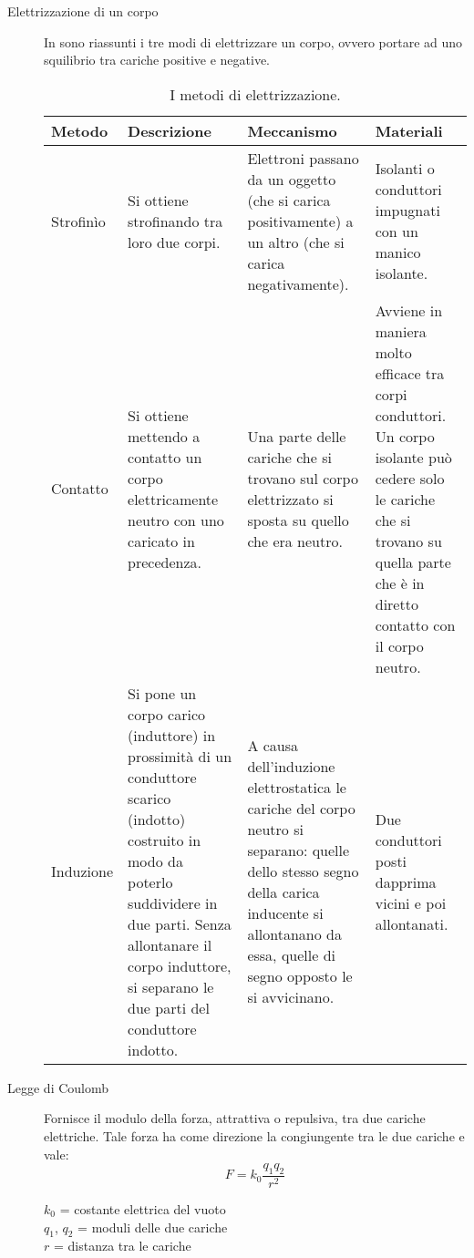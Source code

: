 \documentclass[a4paper,11pt,italian]{article}
\begin{document}
\begin{description}
  \item[Elettrizzazione di un corpo] 
  In  sono riassunti i tre modi di elettrizzare un corpo, ovvero portare ad uno squilibrio tra cariche positive e negative.

\begin{table}[htb]\centering\footnotesize
\begin{tabular}{p{} p{} p{} p{}}\toprule
\textbf{Metodo} & \textbf{Descrizione} & \textbf{Meccanismo} & \textbf{Materiali} \\\midrule
Strofinìo & Si ottiene strofinando tra loro due corpi. & Elettroni passano da un oggetto (che si carica positivamente) a un altro (che si carica negativamente). & Isolanti o conduttori impugnati con un manico isolante.\\\addlinespace[1em]
Contatto & Si ottiene mettendo a contatto un corpo elettricamente neutro con uno caricato in precedenza. & Una parte delle cariche che si trovano sul corpo elettrizzato si sposta su quello che era neutro. & Avviene in maniera molto efficace tra corpi conduttori. Un corpo isolante può cedere solo le cariche che si trovano su quella parte che è in diretto contatto con il corpo neutro.\\\addlinespace[1em]
Induzione & Si pone un corpo carico (induttore) in prossimità di un conduttore scarico (indotto) costruito in modo da poterlo suddividere in due parti. Senza allontanare il corpo induttore, si separano le due parti del conduttore indotto. & A causa dell’induzione elettrostatica le cariche del corpo neutro si separano: quelle dello stesso segno della carica inducente si allontanano da essa, quelle di segno opposto le si avvicinano. & Due conduttori posti dapprima vicini e poi allontanati.\\\bottomrule
\end{tabular}
\caption{I metodi di elettrizzazione.}
\label{tab:elettrizzazione}
\end{table}
  
  \item[Legge di Coulomb] 
  Fornisce il modulo della forza, attrattiva o repulsiva, tra due cariche elettriche. Tale forza ha come direzione la congiungente tra le due cariche e vale:
  \[ F = k_0 \frac{q_1q_2}{r^2} \]
  \begin{multicols}{2}
  $ k_0 $ = costante elettrica del vuoto\\
  $ q_1 $, $ q_2 $ = moduli delle due cariche\\
  $ r $ = distanza tra le cariche
  \end{multicols}
  

\end{description}
\end{document}
